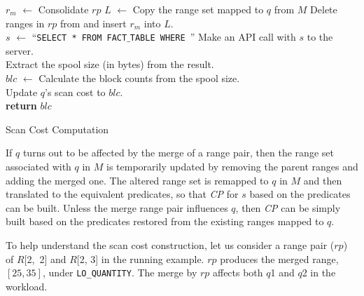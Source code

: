 \documentclass[paper]{ieice}
\def\range#1{$[{#1}]$}
\begin{document}
\begin{algorithm}[t]
{
	$r_{m}$ $\leftarrow$ Consolidate $rp$ \;
	$L$ $\leftarrow$ Copy the range set mapped to $q$ from $M$\; 
	Delete ranges in $rp$ from and insert $r_{m}$ into $L$. \\
	$s$ $\leftarrow$ ``{\tt SELECT * FROM FACT$\_$TABLE WHERE }'' \;
	Make an API call with $s$ to the server. \\
	Extract the spool size (in bytes) from the result. \\
	$blc$ $\leftarrow$ Calculate the block counts from the spool size. \\
	Update $q$'s scan cost to $blc$. \\
	{\bf return} $blc$ \;
}
\caption{Scan Cost Computation}
\label{algo:comp_scan_cost}
\end{algorithm}

If $q$ turns out to be affected by the merge of a range pair, 
then the range set associated with $q$ in $M$ is temporarily updated 
by removing the parent ranges and adding the merged one. 
The altered range set is remapped to $q$ in $M$ and then 
translated to the equivalent predicates, 
so that {\it CP} for $s$ based on the predicates can be built.
Unless the merge range pair influences $q$, then 
{\it CP} can be simply built based on the 
predicates restored from the existing ranges mapped to $q$.

To help understand the scan cost construction, let us 
consider a range pair ($rp$) of \hbox{$R$[2, 2]} and $R$[2, 3] in the running example. 
$rp$ produces the merged range, \range{25, 35}, \hbox{under} {\tt LO\_QUANTITY}. 
The merge by $rp$ affects both $q$1 and $q$2 in the workload.  
\end{document}
